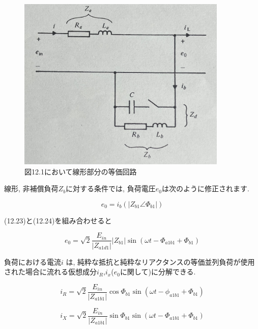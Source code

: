 \documentclass[fleqn,11pt,a4paper,dvipdfmx]{jsarticle}
\numberwithin{equation}{section}
\begin{document}
\setcounter{figure}{1}
\begin{figure}[b]
  \begin{center}
    \includegraphics[width=100mm]{./img/circuit.jpg}
    \caption{図12.1において線形部分の等価回路}
    \label{circuit}
  \end{center}
\end{figure}

\newpage

線形, 非補償負荷$Z_b$に対する条件では, 負荷電圧$e_0$は次のように修正されます. 

\begin{equation}
  e_0 = i_b \left(\left|Z_{b1} \angle \Phi_{b1}\right|\right)
\end{equation}

(12.23)と(12.24)を組み合わせると

\begin{equation}
  e_0 = \sqrt{2} \frac{E_{in}}{\left|Z_{a1d1}\right|} \left|Z_{b1}\right| \sin \left(\omega t - \Phi_{a1b1} + \Phi_{b1}\right)
\end{equation}

負荷における電流$i$ は, 純粋な抵抗と純粋なリアクタンスの等価並列負荷が使用された場合に流れる仮想成分$i_R$,$i_x$($e_0$に関して)に分解できる. 

\begin{equation}
  i_R = \sqrt{2} \frac{E_{in}}{\left|Z_{a1b1}\right|} \cos \Phi_{b1} \sin \left(\omega t - \phi_{a1b1} + \Phi_{b1}\right)
\end{equation}

\begin{equation}
  i_X = \sqrt{2} \frac{E_{in}}{\left|Z_{a1b1}\right|} \sin \Phi_{b1} \sin \left(\omega t - \Phi_{a1b1} + \Phi_{b1}\right)
\end{equation}
\end{document}
